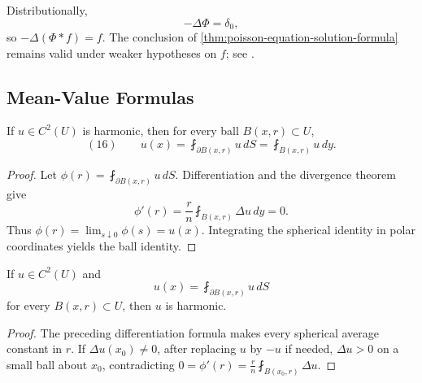 \begin{remark}
\label{rem:poisson-equation-dirac-delta-notation}

Distributionally,
$$-\Delta\Phi=\delta_0,$$
so $-\Delta(\Phi*f)=f$. The conclusion of
\cref{thm:poisson-equation-solution-formula} remains valid under weaker
hypotheses on $f$; see \cite{GilbargTrudinger1983}.
\end{remark}

\subsection{Mean-Value Formulas}
\label{sec:laplace-mean-value-formulas}

\begin{theorem}
\label{thm:mean-value-formulas-laplace}


If $u\in C^2(U)$ is harmonic, then for every ball $B(x,r)\subset U$,
$$(16)\qquad
u(x)=\fint_{\partial B(x,r)}u\,dS
=\fint_{B(x,r)}u\,dy.$$
\end{theorem}
\begin{proof}
\sketch Let $\phi(r)=\fint_{\partial B(x,r)}u\,dS$. Differentiation and the
divergence theorem give
$$\phi'(r)=\frac{r}{n}\fint_{B(x,r)}\Delta u\,dy=0.$$
Thus $\phi(r)=\lim_{s\downarrow0}\phi(s)=u(x)$. Integrating the spherical
identity in polar coordinates yields the ball identity.
\end{proof}

\begin{theorem}
\label{thm:converse-mean-value-property-laplace}



If $u\in C^2(U)$ and
$$u(x)=\fint_{\partial B(x,r)}u\,dS$$
for every $B(x,r)\subset U$, then $u$ is harmonic.
\end{theorem}
\begin{proof}
\sketch The preceding differentiation formula makes every spherical average
constant in $r$. If $\Delta u(x_0)\ne0$, after replacing $u$ by $-u$ if needed,
$\Delta u>0$ on a small ball about $x_0$, contradicting
$0=\phi'(r)=\frac r n\fint_{B(x_0,r)}\Delta u$.
\end{proof}


